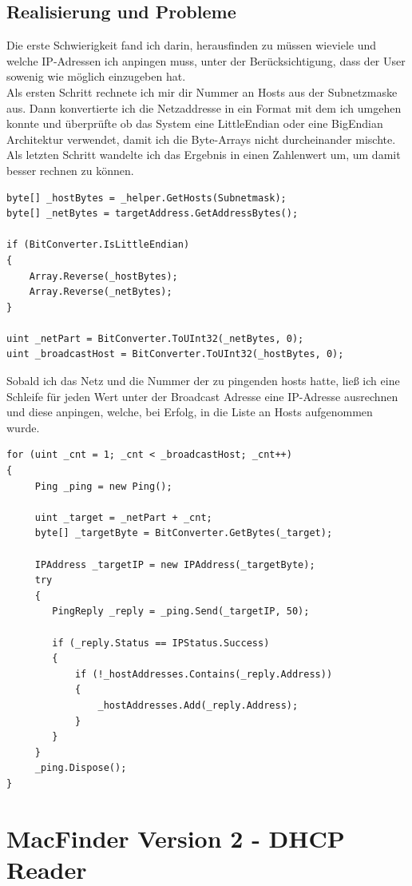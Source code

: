 \documentclass[12pt,a4paper]{report}
\begin{document}
\begin{onehalfspace}
\subsection{Realisierung und Probleme}
Die erste Schwierigkeit fand ich darin, herausfinden zu müssen wieviele und welche IP-Adressen ich anpingen muss, unter der Berücksichtigung, dass der User sowenig wie möglich einzugeben hat.\\
Als ersten Schritt rechnete ich mir dir Nummer an Hosts aus der Subnetzmaske aus. Dann konvertierte ich die Netzaddresse in ein Format mit dem ich umgehen konnte und überprüfte ob das System eine LittleEndian oder eine BigEndian Architektur verwendet, damit ich die Byte-Arrays nicht durcheinander mischte.\\
Als letzten Schritt wandelte ich das Ergebnis in einen Zahlenwert um, um damit besser rechnen zu können.
\begin{lstlisting}
byte[] _hostBytes = _helper.GetHosts(Subnetmask);
byte[] _netBytes = targetAddress.GetAddressBytes();

if (BitConverter.IsLittleEndian)
{
	Array.Reverse(_hostBytes);
    Array.Reverse(_netBytes);
}

uint _netPart = BitConverter.ToUInt32(_netBytes, 0);
uint _broadcastHost = BitConverter.ToUInt32(_hostBytes, 0);
\end{lstlisting}

Sobald ich das Netz und die Nummer der zu pingenden hosts hatte, ließ ich eine Schleife für jeden Wert unter der Broadcast Adresse eine IP-Adresse ausrechnen und diese anpingen, welche, bei Erfolg, in die Liste an Hosts aufgenommen wurde.

\begin{lstlisting}
for (uint _cnt = 1; _cnt < _broadcastHost; _cnt++)
{
     Ping _ping = new Ping();

     uint _target = _netPart + _cnt;
     byte[] _targetByte = BitConverter.GetBytes(_target);

     IPAddress _targetIP = new IPAddress(_targetByte);
     try
     {
     	PingReply _reply = _ping.Send(_targetIP, 50);
	 	
	 	if (_reply.Status == IPStatus.Success)
     	{
     		if (!_hostAddresses.Contains(_reply.Address))
     		{
     			_hostAddresses.Add(_reply.Address);
	 		}
     	}
     }
     _ping.Dispose();
}
\end{lstlisting}

\section{MacFinder Version 2 - DHCP Reader}

\end{onehalfspace}
\end{document}
